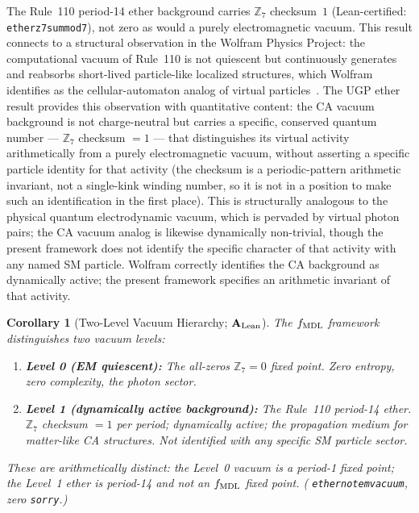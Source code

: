 \documentclass[11pt]{article}
\newtheorem{corollary}[theorem]{Corollary}
\theoremstyle{remark}
\newcommand{\lean}[1]{%
  \penalty-100
  \begingroup\def\_{\textunderscore\allowbreak}\texttt{#1}\endgroup}
\newcommand{\CatAL}{\ensuremath{\textbf{A}_{\rm Lean}}}
\begin{document}
The Rule~110 period-14 ether background carries $\mathbb{Z}_7$ checksum~$1$
(Lean-certified: \lean{ether\_z7\_sum\_mod7}), not zero as would a purely
electromagnetic vacuum.
This result connects to a structural observation in the Wolfram Physics
Project: the computational vacuum of Rule~110 is not quiescent but
continuously generates and reabsorbs short-lived particle-like localized
structures, which Wolfram identifies as the cellular-automaton analog of
virtual particles~\cite{Wolfram2020Tech}.
The UGP ether result provides this observation with quantitative content:
the CA vacuum background is not charge-neutral but carries a specific,
conserved quantum number --- $\mathbb{Z}_7$ checksum $= 1$ --- that
distinguishes its virtual activity arithmetically from a purely
electromagnetic vacuum, without asserting a specific particle identity for
that activity (the checksum is a periodic-pattern arithmetic invariant, not
a single-kink winding number, so it is not in a position to make such an
identification in the first place).
This is structurally analogous to the physical quantum electrodynamic vacuum,
which is pervaded by virtual photon pairs; the CA vacuum analog is likewise
dynamically non-trivial, though the present framework does not identify the
specific character of that activity with any named SM particle.
Wolfram correctly identifies the CA background as dynamically active; the
present framework specifies an arithmetic invariant of that activity.

\begin{corollary}[Two-Level Vacuum Hierarchy; $\CatAL$]
\label{cor:two_level_vacuum}
The $f_{\rm MDL}$ framework distinguishes two vacuum levels:
\begin{enumerate}[nosep,leftmargin=1.5em]
\item \textbf{Level 0 (EM quiescent):} The all-zeros $\mathbb{Z}_7 = 0$
  fixed point.  Zero entropy, zero complexity, the photon sector.
\item \textbf{Level 1 (dynamically active background):} The Rule~110
  period-14 ether.  $\mathbb{Z}_7$ checksum $= 1$ per period; dynamically
  active; the propagation medium for matter-like CA structures. Not
  identified with any specific SM particle sector.
\end{enumerate}
These are arithmetically distinct: the Level~0 vacuum is a period-1 fixed
point; the Level~1 ether is period-14 and not an $f_{\rm MDL}$ fixed point.
(\lean{ether\_not\_em\_vacuum}, zero \texttt{sorry}.)
\end{corollary}
\end{document}
